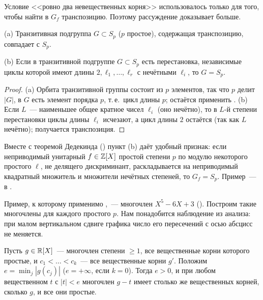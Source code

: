 Условие <<ровно два невещественных корня>> использовалось только для того, чтобы найти в $G_f$ транспозицию. Поэтому
рассуждение доказывает больше.

\begin{corollary}[4.16a]
\textup{(a)} Транзитивная подгруппа $G\subset S_p$ \textup($p$ простое\textup), содержащая транспозицию, совпадает с $S_p$.

\textup{(b)} Если в транзитивной подгруппе $G\subset S_p$ есть перестановка, независимые циклы которой имеют длины
$2,\ell_1,\dots,\ell_r$ с нечётными $\ell_i$, то $G=S_p$.
\end{corollary}

\begin{proof}
(a) Орбита транзитивной группы состоит из $p$ элементов, так что $p$ делит $|G|$, в $G$ есть элемент порядка $p$, т.\,е.\
цикл длины $p$; остаётся применить . (b) Если $L$~--- наименьшее общее кратное чисел $\ell_i$ (оно нечётно), то в
$L$-й степени перестановки циклы длины $\ell_i$ исчезают, а цикл длины $2$ остаётся (так как $L$ нечётно); получается транспозиция.
\end{proof}

Вместе с теоремой Дедекинда () пункт (b) даёт удобный признак: если неприводимый унитарный $f\in\mathbb Z[X]$ простой
степени $p$ по модулю некоторого простого $\ell$, не делящего дискриминант, раскладывается на неприводимый квадратный
множитель и множители нечётных степеней, то $G_f=S_p$. Пример~--- в \rf{4.18}.

Пример, к которому применимо ,~--- многочлен $X^5-6X+3$ (). Построим такие многочлены для каждого простого
$p$. Нам понадобится наблюдение из анализа: при малом вертикальном сдвиге графика число его пересечений с осью абсцисс
не меняется.

\begin{lemma}[4.16b]
Пусть $g\in\mathbb R[X]$~--- многочлен степени $\ge1$, все вещественные корни которого простые, и $c_1<\dots<c_k$~--- все
вещественные корни $g'$. Положим $e=\min_j|g(c_j)|$ \textup($e=+\infty$, если $k=0$\textup). Тогда $e>0$, и при любом
вещественном $t$ с $|t|<e$ многочлен $g-t$ имеет столько же вещественных корней, сколько $g$, и все они простые.
\end{lemma}

